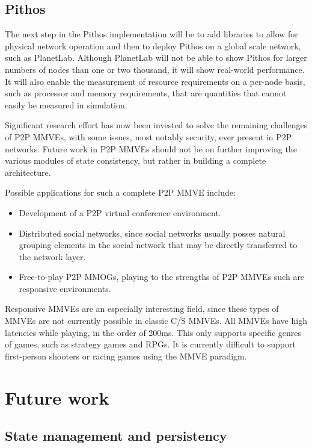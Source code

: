 \subsection{Pithos}
The next step in the Pithos implementation will be to add libraries to allow for physical network operation and then to deploy Pithos on a global scale network, such as PlanetLab. Although PlanetLab will not be able to show Pithos for larger numbers of nodes than one or two thousand, it will show real-world performance. It will also enable the measurement of resource requirements on a per-node basis, such as processor and memory requirements, that are quantities that cannot easily be measured in simulation.

Significant research effort has now been invested to solve the remaining challenges of P2P MMVEs, with some issues, most notably security, ever present in P2P networks. Future work in P2P MMVEs should not be on further improving the various modules of state consistency, but rather in building a complete architecture.

Possible applications for such a complete P2P MMVE include:
%
\begin{itemize}
\item Development of a P2P virtual conference environment.
\item Distributed social networks, since social networks usually posses natural grouping elements in the social network that may be directly transferred to the network layer.
\item Free-to-play P2P MMOGs, playing to the strengths of P2P MMVEs such are responsive environments.
\end{itemize}

Responsive MMVEs are an especially interesting field, since these types of MMVEs are not currently possible in classic C/S MMVEs. All MMVEs have high latencies while playing, in the order of 200ms. This only supports specific genres of games, such as strategy games and RPGs. It is currently difficult to support first-person shooters or racing games using the MMVE paradigm.

\section{Future work}

\subsection{State management and persistency}

